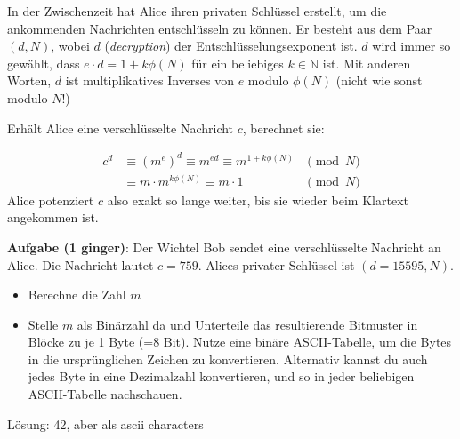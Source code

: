 \documentclass{article}
\newcommand{\N}{\mathbb{N}}
\begin{document}
In der Zwischenzeit hat Alice ihren privaten Schlüssel erstellt, um die ankommenden Nachrichten entschlüsseln zu können. Er besteht aus dem Paar $(d, N)$, wobei $d$ (\emph{decryption}) der Entschlüsselungsexponent ist. $d$ wird immer so gewählt, dass $e\cdot d = 1+ k\phi(N)$ für ein beliebiges $k \in \N$ ist. Mit anderen Worten, $d$ ist multiplikatives Inverses von $e$ modulo $\phi(N)$ (nicht wie sonst modulo $N$!)

Erhält Alice eine verschlüsselte Nachricht $c$, berechnet sie:

\begin{align*}
    c^d &\equiv (m^e)^d \equiv m^{ed} \equiv m^{1+k\phi(N)} &\pmod N \\
    &\equiv m \cdot m^{k\phi(N)} \equiv m \cdot 1 &\pmod N
\end{align*}
Alice potenziert $c$ also exakt so lange weiter, bis sie wieder beim Klartext angekommen ist. 

\textbf{Aufgabe (1 ginger)}: Der Wichtel Bob sendet eine verschlüsselte Nachricht an Alice. Die Nachricht lautet $c = 759$. Alices privater Schlüssel ist $(d = 15595, N)$.
\begin{itemize}
    \item Berechne die Zahl $m$
    \item Stelle $m$ als Binärzahl da und Unterteile das resultierende Bitmuster in Blöcke zu je 1 Byte (=8 Bit). Nutze eine binäre ASCII-Tabelle, um die Bytes in die ursprünglichen Zeichen zu konvertieren. Alternativ kannst du auch jedes Byte in eine Dezimalzahl konvertieren, und so in jeder beliebigen ASCII-Tabelle nachschauen.
\end{itemize}

Lösung: 42, aber als ascii characters
\end{document}
